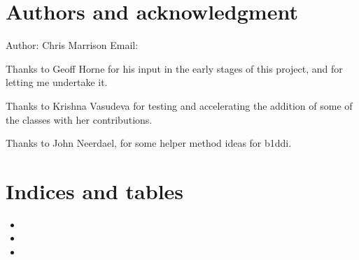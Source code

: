 \documentclass[letterpaper,10pt,english]{sphinxmanual}
\begin{document}
\chapter{Authors and acknowledgment}
\label{\detokenize{ackowledgements:authors-and-acknowledgment}}\label{\detokenize{ackowledgements::doc}}
\sphinxAtStartPar
Author: Chris Marrison
Email: 

\sphinxAtStartPar
Thanks to Geoff Horne for his input in the early stages of this project, and
for letting me undertake it.

\sphinxAtStartPar
Thanks to Krishna Vasudeva for testing and accelerating the addition of some of
the classes with her contributions.

\sphinxAtStartPar
Thanks to John Neerdael, for some helper method ideas for b1ddi.


\chapter{Indices and tables}
\label{\detokenize{index:indices-and-tables}}\begin{itemize}
\item {} 
\sphinxAtStartPar
{}

\item {} 
\sphinxAtStartPar
{}

\item {} 
\sphinxAtStartPar
{}

\end{itemize}


\renewcommand{\indexname}{Python Module Index}
\begin{sphinxtheindex}
\let\bigletter\sphinxstyleindexlettergroup
\bigletter{b}
\item\relax{}
\item\relax{}
\end{sphinxtheindex}

\renewcommand{\indexname}{Index}
\printindex
\end{document}
